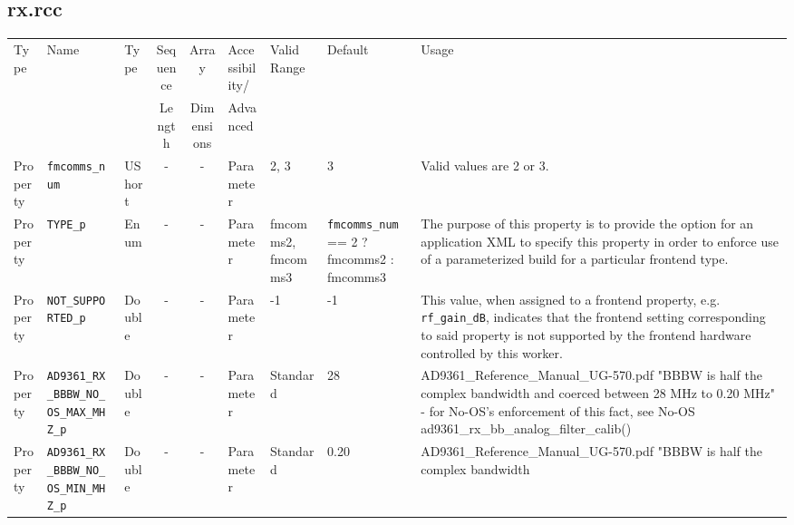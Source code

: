 \documentclass{article}
\def\comp{rx}
\begin{document}
\begin{landscape}
	\subsection*{\comp.rcc}
	\begin{scriptsize}
		\begin{longtable}{|p{1.8cm}|p{4.1cm}|p{1cm}|c|c|p{1.6cm}|p{3.7cm}|p{3.7cm}|p{2.5cm}|}
			\hline
			\rowcolor{blue}
			Type         & Name                                & Type & Sequence & Array      & Accessibility/ & Valid Range  & Default & Usage                                                                                                                                                                                                                       \\
			\rowcolor{blue}
			             &                                     &      & Length   & Dimensions & Advanced       &              &         &                                                                                                                                                                                                                             \\
			\hline
			Property     & \verb+fmcomms_num+                   & UShort &-        & -          & Parameter & 2, 3 & 3 & Valid values are 2 or 3.\\
			\hline
			Property     & \verb+TYPE_p+                   & Enum &-        & -          & Parameter & fmcomms2, fmcomms3 & \verb+fmcomms_num+ == 2 ? fmcomms2 : fmcomms3 & The purpose of this property is to provide the option for     an application XML to specify this property in order to enforce use of a parameterized build for a     particular frontend type.\\
			\hline
			Property     & \verb+NOT_SUPPORTED_p+                   & Double&-        & -          & Parameter & -1 & -1 & This value, when assigned to a frontend property, e.g. \verb+rf_gain_dB+, indicates that the frontend setting corresponding to said property is not supported by the frontend hardware controlled by this worker.
			 \\
			\hline
			Property     & \verb+AD9361_RX_BBBW_NO_OS_MAX_MHZ_p+ & Double & -       & -          & Parameter & Standard & 28 & AD9361\_Reference\_Manual\_UG-570.pdf "BBBW is half the complex bandwidth
        and coerced between 28 MHz to 0.20 MHz" - for No-OS's enforcement of
        this fact, see No-OS ad9361\_rx\_bb\_analog\_filter\_calib()  \\
			\hline
			Property     & \verb+AD9361_RX_BBBW_NO_OS_MIN_MHZ_p+ & Double & -       & -          & Parameter & Standard & 0.20 & AD9361\_Reference\_Manual\_UG-570.pdf "BBBW is half the complex bandwidth

\end{longtable}
\end{scriptsize}
\end{landscape}
\end{document}
